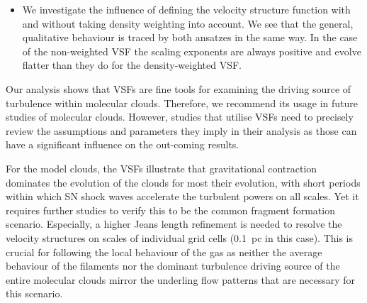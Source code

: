 \begin{itemize}
    \item We investigate the influence of defining the velocity structure function with and without taking density weighting into account. We see that the general, qualitative behaviour is traced by both ansatzes in the same way. In the case of the non-weighted VSF the scaling exponents are always positive and evolve flatter than they do for the density-weighted VSF.
\end{itemize}

Our analysis shows that VSFs are fine tools for examining the driving source of turbulence within molecular clouds.
Therefore, we recommend its usage in future studies of molecular clouds.
However, studies that utilise VSFs need to precisely review the assumptions and parameters they imply in their analysis as those can have a significant influence on the out-coming results.

For the model clouds, the VSFs illustrate that gravitational contraction dominates the evolution of the clouds for most their evolution, with short periods within which SN shock waves accelerate the turbulent powers on all scales. 
Yet it requires further studies to verify this to be the common fragment formation scenario. 
Especially, a higher Jeans length refinement is needed to resolve the velocity structures on scales of individual grid cells (0.1~pc in this case).
This is crucial for following the local behaviour of the gas as neither the average behaviour of the filaments nor the dominant turbulence driving source of the entire molecular clouds mirror the underling flow patterns that are necessary for this scenario. 



\endinput
